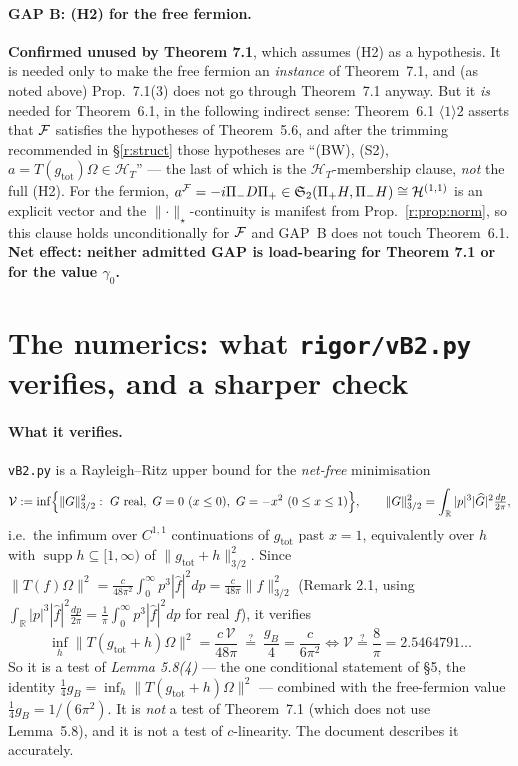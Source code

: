 \documentclass[11pt]{article}
\newcommand{\HT}{\mathcal H_T}
\newcommand{\norm}[1]{\lVert#1\rVert}
\newcommand{\supp}{\operatorname{supp}}
\newcommand{\gB}{g_B}
\newcommand{\Hil}{\mathcal H}
\newcommand{\Stwo}{\mathfrak S_2}
\newcommand{\Om}{\Omega}
\newcommand{\gtot}{g_{\mathrm{tot}}}
\begin{document}
\paragraph{GAP B: (H2) for the free fermion.}
\textbf{Confirmed unused by Theorem 7.1}, which assumes (H2) as a hypothesis.  It is needed only to make the
free fermion an \emph{instance} of Theorem~7.1, and (as noted above) Prop.~7.1(3) does not go through
Theorem~7.1 anyway.  But it \emph{is} needed for Theorem~6.1, in the following indirect sense:
Theorem~6.1 $\langle1\rangle2$ asserts that $\mathcal F$ satisfies the hypotheses of Theorem~5.6, and after the
trimming recommended in \S\ref{r:struct} those hypotheses are ``(BW), (S2), $a=T(\gtot)\Om\in\HT$'' --- the
last of which is the $\HT$-membership clause, \emph{not} the full (H2).  For the fermion,
$a^{\cF}=-i\Pi_-D\Pi_+\in\Stwo(\Pi_+H,\Pi_-H)\cong\Hil^{(1,1)}$ is an explicit vector and the
$\norm\cdot_\star$-continuity is manifest from Prop.~\ref{r:prop:norm}, so this clause holds
unconditionally for $\mathcal F$ and GAP~B does not touch Theorem~6.1.  \textbf{Net effect: neither admitted GAP
is load-bearing for Theorem 7.1 or for the value $\gamma_0$.}


\section{The numerics: what \texttt{rigor/vB2.py} verifies, and a sharper check}\label{r:num}

\paragraph{What it verifies.}  \texttt{vB2.py} is a Rayleigh--Ritz upper bound for the \emph{net-free}
minimisation
\begin{equation}\label{eq:varprob}
 \mathcal V:=\inf\Bigl\{\norm G_{3/2}^2:\ G\ \text{real},\ G=0\ (x\le0),\ G=-x^2\ (0\le x\le1)\Bigr\},
 \qquad \norm G_{3/2}^2=\int_{\mathbb R}|p|^3|\widehat G|^2\tfrac{dp}{2\pi},
\end{equation}
i.e.\ the infimum over $C^{1,1}$ continuations of $\gtot$ past $x=1$, equivalently over
$h$ with $\supp h\subseteq[1,\infty)$ of $\norm{\gtot+h}_{3/2}^2$.  Since
$\norm{T(f)\Om}^2=\frac c{48\pi^2}\int_0^\infty p^3|\widehat f|^2dp=\frac c{48\pi}\norm f_{3/2}^2$
(Remark 2.1, using $\int_{\mathbb R}|p|^3|\widehat f|^2\frac{dp}{2\pi}=\frac1\pi\int_0^\infty p^3|\widehat f|^2dp$
for real $f$), it verifies
\[
 \inf_h\norm{T(\gtot+h)\Om}^2=\frac{c\,\mathcal V}{48\pi}\ \overset?=\ \frac{\gB}4=\frac c{6\pi^2}
 \iff \mathcal V\overset?=\frac8\pi=2.5464791\ldots
\]
So it is a test of \emph{Lemma 5.8(4)} --- the one conditional statement of \S5, the identity
$\frac14\gB=\inf_h\norm{T(\gtot+h)\Om}^2$ --- combined with the free-fermion value $\frac14\gB=1/(6\pi^2)$.
It is \emph{not} a test of Theorem~7.1 (which does not use Lemma~5.8), and it is not a test of
$c$-linearity.  The document describes it accurately.
\end{document}
